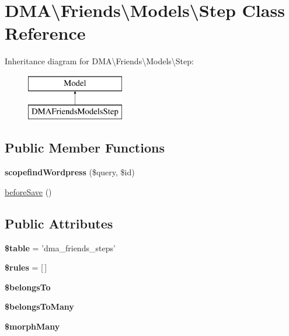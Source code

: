 \hypertarget{classDMA_1_1Friends_1_1Models_1_1Step}{\section{D\-M\-A\textbackslash{}Friends\textbackslash{}Models\textbackslash{}Step Class Reference}
\label{classDMA_1_1Friends_1_1Models_1_1Step}
}
Inheritance diagram for D\-M\-A\textbackslash{}Friends\textbackslash{}Models\textbackslash{}Step\-:\begin{figure}[H]
\begin{center}
\leavevmode
\includegraphics[height=2.000000cm]{d9/d03/classDMA_1_1Friends_1_1Models_1_1Step}
\end{center}
\end{figure}
\subsection*{Public Member Functions}
\begin{DoxyCompactItemize}
\item 
\hypertarget{classDMA_1_1Friends_1_1Models_1_1Step_a58a71b1c9b39249ac24484bbd2307db2}{{\bfseries scopefind\-Wordpress} (\$query, \$id)}\label{classDMA_1_1Friends_1_1Models_1_1Step_a58a71b1c9b39249ac24484bbd2307db2}

\item 
\hyperlink{classDMA_1_1Friends_1_1Models_1_1Step_abed223d05f52e5e39b0991929695cee9}{before\-Save} ()
\end{DoxyCompactItemize}
\subsection*{Public Attributes}
\begin{DoxyCompactItemize}
\item 
\hypertarget{classDMA_1_1Friends_1_1Models_1_1Step_a73a0d48cb46b1aeeaad83499e8449acc}{{\bfseries \$table} = 'dma\-\_\-friends\-\_\-steps'}\label{classDMA_1_1Friends_1_1Models_1_1Step_a73a0d48cb46b1aeeaad83499e8449acc}

\item 
\hypertarget{classDMA_1_1Friends_1_1Models_1_1Step_a13476d5ca718080b85c9633270bf4942}{{\bfseries \$rules} = \mbox{[}$\,$\mbox{]}}\label{classDMA_1_1Friends_1_1Models_1_1Step_a13476d5ca718080b85c9633270bf4942}

\item 
{\bfseries \$belongs\-To}
\item 
{\bfseries \$belongs\-To\-Many}
\item 
{\bfseries \$morph\-Many}
\end{DoxyCompactItemize}
